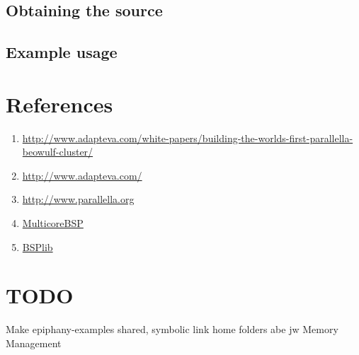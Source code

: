 \documentclass[fleqn]{article}
\renewcommand{\(}{\left(}
\renewcommand{\)}{\right)}
\begin{document}
\subsection{Obtaining the source}

\subsection{Example usage}

\section{References}

\begin{enumerate}
    \item \url{http://www.adapteva.com/white-papers/building-the-worlds-first-parallella-beowulf-cluster/}
    \item \url{http://www.adapteva.com/}
    \item \url{http://www.parallella.org}
    \item \url{MulticoreBSP}
    \item \url{BSPlib}
\end{enumerate}

\section{TODO}

Make epiphany-examples shared, symbolic link home folders abe jw
Memory Management
\end{document}
